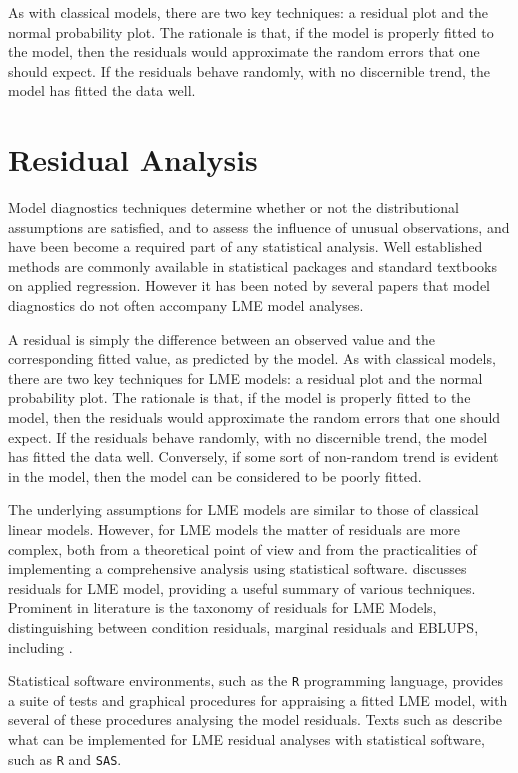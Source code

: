 \documentclass[12pt, a4paper]{report}
\theoremstyle{plain}
\theoremstyle{definition}
\theoremstyle{remark}
\begin{document}
As with classical models, there are two key techniques: a residual plot and the normal probability plot. The rationale is that, if the model is properly fitted to the model, then the residuals would approximate the random errors that one should expect. If the residuals behave randomly, with no discernible trend, the model has fitted the data well. 
	
\section{Residual Analysis}
Model diagnostics techniques determine whether or not the distributional assumptions are satisfied, and to assess the influence of unusual observations, and have been become a required part of any statistical analysis. Well established methods are commonly available in statistical packages and standard textbooks on applied regression. However it has been noted by several papers that model diagnostics do not often accompany LME model analyses. 

A residual is simply the difference between an observed value and the corresponding fitted value, as predicted by the model. As with classical models, there are two key techniques for LME models: a residual plot and the normal probability plot. The rationale is that, if the model is properly fitted to the model, then the residuals would approximate the random errors that one should expect.
If the residuals behave randomly, with no discernible trend, the model has fitted the data well. Conversely, if some sort of non-random trend is evident in the model, then the model can be considered to be poorly fitted. 

The underlying assumptions for LME models are similar to those of classical linear models. However, for LME models the matter of residuals are more complex, both from a theoretical point of view and from the practicalities of implementing a comprehensive analysis using statistical software. \citet{schabenberger} discusses residuals for LME model, providing a useful summary of various techniques. Prominent in literature is the taxonomy of residuals for LME Models, distinguishing between condition residuals, marginal residuals and EBLUPS, including \citet{ HildenMinton, schabenberger, west, NobreSinger2007}.  

Statistical software environments, such as the \texttt{R} programming language, provides a suite of tests and graphical procedures for appraising a fitted LME model, with several of these procedures analysing the model residuals. Texts such as \citet{PB,west,Galecki} describe what can be implemented for LME residual analyses with statistical software, such as \texttt{R} and \texttt{SAS}.
\end{document}
